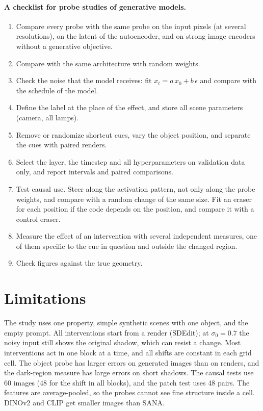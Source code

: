 \documentclass[10pt]{article}
\begin{document}
\paragraph{A checklist for probe studies of generative models.}
\begin{enumerate}
    \item Compare every probe with the same probe on the input pixels (at several resolutions), on the latent of the autoencoder, and on strong image encoders without a generative objective.
    \item Compare with the same architecture with random weights.
    \item Check the noise that the model receives: fit $x_t=a\,x_0+b\,\epsilon$ and compare with the schedule of the model.
    \item Define the label at the place of the effect, and store all scene parameters (camera, all lamps).
    \item Remove or randomize shortcut cues, vary the object position, and separate the cues with paired renders.
    \item Select the layer, the timestep and all hyperparameters on validation data only, and report intervals and paired comparisons.
    \item Test causal use. Steer along the activation pattern, not only along the probe weights, and compare with a random change of the same size. Fit an eraser for each position if the code depends on the position, and compare it with a control eraser.
    \item Measure the effect of an intervention with several independent measures, one of them specific to the cue in question and outside the changed region.
    \item Check figures against the true geometry.
\end{enumerate}

\section{Limitations}
The study uses one property, simple synthetic scenes with one object, and the empty prompt.
All interventions start from a render (SDEdit); at $\sigma_0=0.7$ the noisy input still shows the original shadow, which can resist a change.
Most interventions act in one block at a time, and all shifts are constant in each grid cell.
The object probe has larger errors on generated images than on renders, and the dark-region measure has large errors on short shadows.
The causal tests use 60 images (48 for the shift in all blocks), and the patch test uses 48 pairs.
The features are average-pooled, so the probes cannot see fine structure inside a cell.
DINOv2 and CLIP get smaller images than SANA.
\end{document}
